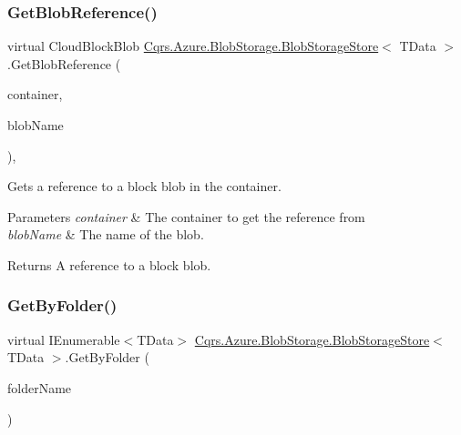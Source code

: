 \subsubsection{\texorpdfstring{Get\+Blob\+Reference()}{GetBlobReference()}}
{\footnotesize\ttfamily virtual Cloud\+Block\+Blob \hyperlink{classCqrs_1_1Azure_1_1BlobStorage_1_1BlobStorageStore}{Cqrs.\+Azure.\+Blob\+Storage.\+Blob\+Storage\+Store}$<$ T\+Data $>$.Get\+Blob\+Reference (\begin{DoxyParamCaption}\item[{Cloud\+Blob\+Container}]{container,  }\item[{string}]{blob\+Name }\end{DoxyParamCaption})\hspace{0.3cm}{\ttfamily [protected]}, {\ttfamily [virtual]}}



Gets a reference to a block blob in the container. 


\begin{DoxyParams}{Parameters}
{\em container} & The container to get the reference from\\
\hline
{\em blob\+Name} & The name of the blob.\\
\hline
\end{DoxyParams}
\begin{DoxyReturn}{Returns}
A reference to a block blob.
\end{DoxyReturn}
\mbox{\label{classCqrs_1_1Azure_1_1BlobStorage_1_1BlobStorageStore_a96064e01ccf12413582acd7497f3802d}} 
\subsubsection{\texorpdfstring{Get\+By\+Folder()}{GetByFolder()}}
{\footnotesize\ttfamily virtual I\+Enumerable$<$T\+Data$>$ \hyperlink{classCqrs_1_1Azure_1_1BlobStorage_1_1BlobStorageStore}{Cqrs.\+Azure.\+Blob\+Storage.\+Blob\+Storage\+Store}$<$ T\+Data $>$.Get\+By\+Folder (\begin{DoxyParamCaption}\item[{string}]{folder\+Name }\end{DoxyParamCaption})\hspace{0.3cm}{\ttfamily [virtual]}}


